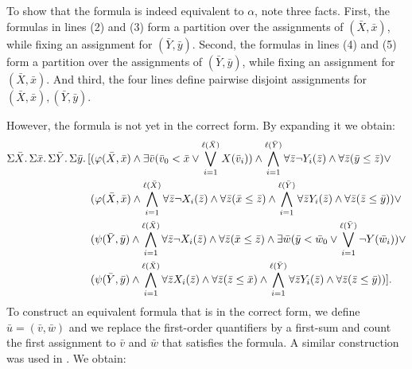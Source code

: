 To show that the formula is indeed equivalent to $\alpha$, note three facts. First, the formulas in lines (2) and (3) form a partition over the assignments of $(\bar{X},\bar{x})$, while fixing an assignment for $(\bar{Y},\bar{y})$. Second, the formulas in lines (4) and (5) form a partition over the assignments of $(\bar{Y},\bar{y})$, while fixing an assignment for $(\bar{X},\bar{x})$. And third, the four lines define pairwise disjoint assignments for $(\bar{X},\bar{x}),(\bar{Y},\bar{y})$.

However, the formula is not yet in the correct form. By expanding it we obtain:
\begin{align*}
\Sigma{\bar{X}}.\,\Sigma{\bar{x}}.\,\Sigma{\bar{Y}}.\,\Sigma{\bar{y}}.\,[&(\varphi(\bar{X},\bar{x})\wedge\exists\bar{v}(\bar{v}_0 < \bar{x} \vee \bigvee_{i = 1}^{\ell(\bar{X})}X(\bar{v}_i))\wedge\bigwedge_{i = 1}^{\ell(\bar{Y})} \forall\bar{z}\neg Y_i(\bar{z}) \wedge \forall\bar{z}(\bar{y}\leq\bar{z})\vee\\
&(\varphi(\bar{X},\bar{x})\wedge\bigwedge_{i = 1}^{\ell(\bar{X})} \forall\bar{z}\neg X_i(\bar{z}) \wedge \forall\bar{z}(\bar{x}\leq\bar{z})\wedge\bigwedge_{i = 1}^{\ell(\bar{Y})} \forall\bar{z} Y_i(\bar{z}) \wedge \forall\bar{z}(\bar{z}\leq\bar{y}))\vee\\
&(\psi(\bar{Y},\bar{y})\wedge\bigwedge_{i = 1}^{\ell(\bar{X})} \forall\bar{z}\neg X_i(\bar{z}) \wedge \forall\bar{z}(\bar{x}\leq\bar{z})\wedge\exists\bar{w}(\bar{y} < \bar{w}_0 \vee \bigvee_{i = 1}^{\ell(\bar{Y})}\neg Y(\bar{w}_i))\vee\\
&(\psi(\bar{Y},\bar{y})\wedge\bigwedge_{i = 1}^{\ell(\bar{X})} \forall\bar{z} X_i(\bar{z}) \wedge \forall\bar{z}(\bar{z}\leq\bar{x})\wedge\bigwedge_{i = 1}^{\ell(\bar{Y})} \forall\bar{z} Y_i(\bar{z}) \wedge \forall\bar{z}(\bar{z}\leq\bar{y}))].
\end{align*}
To construct an equivalent formula that is in the correct form, we define $\bar{u} = (\bar{v},\bar{w})$ and we replace the first-order quantifiers by a first-sum and count the first assignment to $\bar{v}$ and $\bar{w}$ that satisfies the formula. A similar construction was used in \cite{SalujaST95}. We obtain:
